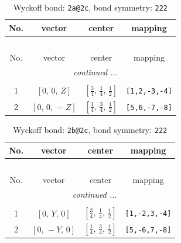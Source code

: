 \documentclass[fleqn,8pt]{jsarticle}
\begin{document}
\begin{longtable}{cccc}
\caption{Wyckoff bond: {\tt 2a@2c}, bond symmetry: {\tt 222}}
 \\
 \hline \hline
No. & vector & center & mapping \\ \hline \endfirsthead

\multicolumn{3}{l}{\tablename\ \thetable{}} \\
 \hline \hline
No. & vector & center & mapping \\ \hline \endhead

 \hline \hline
\multicolumn{3}{r}{\footnotesize\it continued ...} \\ \endfoot

 \hline \hline
\multicolumn{3}{r}{} \\ \endlastfoot

1 & $\left[ 0,\, 0,\, Z \right]$ & $\left[ \frac{3}{4},\, \frac{1}{4},\, \frac{1}{2} \right]$ & {\tt [1,2,-3,-4]} \\ \hline
2 & $\left[ 0,\, 0,\, - Z \right]$ & $\left[ \frac{1}{4},\, \frac{3}{4},\, \frac{1}{2} \right]$ & {\tt [5,6,-7,-8]} \\
\end{longtable}
\renewcommand{\arraystretch}{1.2}
\begin{longtable}{cccc}
\caption{Wyckoff bond: {\tt 2b@2c}, bond symmetry: {\tt 222}}
 \\
 \hline \hline
No. & vector & center & mapping \\ \hline \endfirsthead

\multicolumn{3}{l}{\tablename\ \thetable{}} \\
 \hline \hline
No. & vector & center & mapping \\ \hline \endhead

 \hline \hline
\multicolumn{3}{r}{\footnotesize\it continued ...} \\ \endfoot

 \hline \hline
\multicolumn{3}{r}{} \\ \endlastfoot

1 & $\left[ 0,\, Y,\, 0 \right]$ & $\left[ \frac{3}{4},\, \frac{1}{4},\, \frac{1}{2} \right]$ & {\tt [1,-2,3,-4]} \\ \hline
2 & $\left[ 0,\, - Y,\, 0 \right]$ & $\left[ \frac{1}{4},\, \frac{3}{4},\, \frac{1}{2} \right]$ & {\tt [5,-6,7,-8]} \\
\end{longtable}
\renewcommand{\arraystretch}{1.2}
\end{document}
